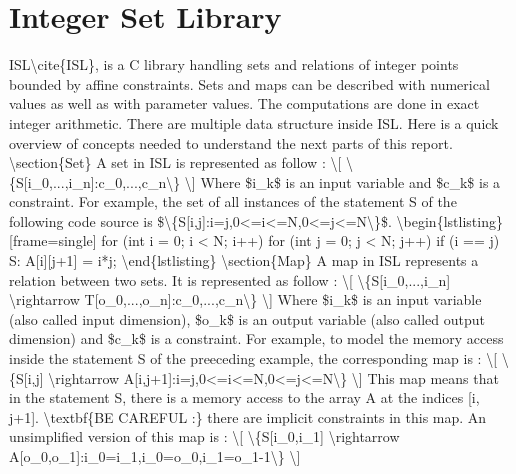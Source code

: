 \chapter{Integer Set Library}\label{ch:ISL}

\ac{ISL\cite{ISL}, is a C library handling sets and relations of integer points bounded by affine constraints. Sets and maps can be described with numerical values as well as with parameter values. The computations are done in exact integer arithmetic. 

There are multiple data structure inside ISL. Here is a quick overview of concepts needed to understand the next parts of this report. 

\section{Set}
A set in ISL is represented as follow :
\[
\{S[i_0,...,i_n]:c_0,...,c_n\}
\]
Where $i_k$ is an input variable and $c_k$ is a constraint.

For example, the set of all instances of the statement S of the following code source is $\{S[i,j]:i=j,0<=i<=N,0<=j<=N\}$.
\begin{lstlisting}[frame=single]
for (int i = 0; i < N; i++)
  for (int j = 0; j < N; j++)
    if (i == j)
S:    A[i][j+1] = i*j;
\end{lstlisting}

\section{Map}
A map in ISL represents a relation between two sets. It is represented as follow :
\[
\{S[i_0,...,i_n] \rightarrow T[o_0,...,o_n]:c_0,...,c_n\}
\]

Where $i_k$ is an input variable (also called input dimension), $o_k$ is an output variable (also called output dimension) and $c_k$ is a constraint.

For example, to model the memory access inside the statement S of the preeceding example, the corresponding map is :
\[
\{S[i,j] \rightarrow A[i,j+1]:i=j,0<=i<=N,0<=j<=N\}
\]
This map means that in the statement S, there is a memory access to the array A at the indices [i, j+1].

\textbf{BE CAREFUL :} there are implicit constraints in this map. An unsimplified version of this map is :

\[
\{S[i_0,i_1] \rightarrow A[o_0,o_1]:i_0=i_1,i_0=o_0,i_1=o_1-1\}
\]

}
